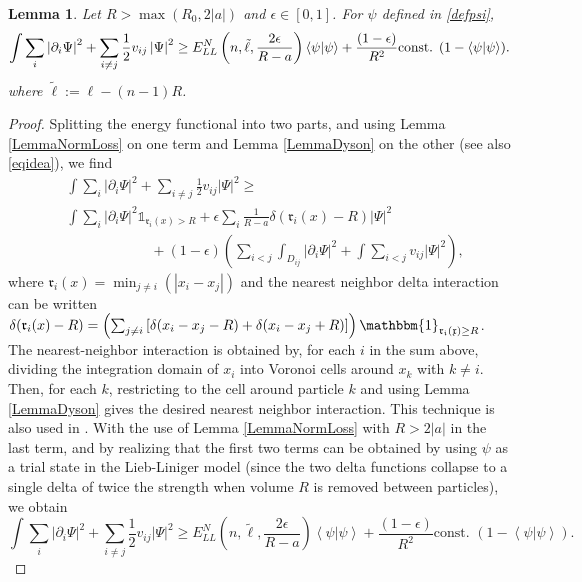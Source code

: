 \documentclass[a4paper,11pt]{article}
\newcommand{\abs}[1]{\left\lvert #1 \right\rvert}
\renewcommand{\braket}[1]{\left\langle#1\right\rangle}
\newtheorem{lemma}[theorem]{Lemma}
\numberwithin{equation}{section}
\begin{document}
	\begin{lemma}\label{LemmaNormBoundEpsilon}
		 Let $R>\max\left(R_0,2\abs{a}\right) $ and $ \epsilon\in[0,1] $. For $ \psi $ defined in \eqref{defpsi},
		\begin{equation}
		\int \sum_{i}\abs{\partial_i\Psi}^2+\sum_{i\neq j} \frac{1}{2}v_{ij}\abs{\Psi}^2\geq E_{LL}^N \left(n,\tilde{\ell},\frac{2\epsilon}{R-a}\right)\braket{\psi|\psi}+ \frac{(1-\epsilon)}{R^2}\textnormal{const. }(1-\braket{\psi|\psi}).
		\end{equation}
		where $ \tilde{\ell}:=\ell-(n-1)R $.
	\end{lemma}
	\begin{proof}
		Splitting the energy functional into two parts, and using Lemma \ref{LemmaNormLoss} on one term and Lemma \ref{LemmaDyson} on the other (see also \eqref{eqidea}), we find 
		\begin{equation}
		\begin{aligned}
		&\int \sum_{i}\abs{\partial_i\Psi}^2+\sum_{i\neq j} \frac{1}{2}v_{ij}\abs{\Psi}^2\geq\\ &\int\sum_{i}\abs{\partial_i\Psi}^2\mathds{1}_{\mathfrak{r}_i(x)>R}+\epsilon\sum_{i}\frac{1}{R-a}\delta(\mathfrak{r}_i(x)-R)\abs{\Psi}^2\\&\qquad\qquad\qquad+ (1-\epsilon)\left(\sum_{i<j}\int_{D_{ij}}\abs{\partial_i \Psi}^2+\int\sum_{i<j} v_{ij} \abs{\Psi}^2\right),
		\end{aligned}
		\end{equation}
		where $ \mathfrak{r}_i(x)=\min_{j\neq i}(\abs{x_i-x_j}) $ and the nearest neighbor delta interaction can be written $\delta(\mathfrak{r}_i(x)-R)=\left(\sum_{j\neq i}\left[\delta(x_i-x_j-R)+\delta(x_i-x_j+R)\right]\right)\mathbbm{1}_{\mathfrak{r_i(x)}\geq R}$. The nearest-neighbor interaction is obtained by, for each $i$ in the sum above, dividing the integration domain of $x_i$ into Voronoi cells around $x_k$ with $k\neq i$. Then, for each $k$, restricting to the cell around particle $ k $ and using Lemma \ref{LemmaDyson} gives the desired nearest neighbor interaction. This technique is also used in \cite{lieb2006mathematics}.
		With the use of Lemma \ref{LemmaNormLoss} with $ R>2\abs{a} $ in the last term, and by realizing that the first two terms can be obtained by using $ \psi $ as a trial state in the Lieb-Liniger model (since the two delta functions collapse to a single delta of twice the strength when volume $R$ is removed between particles), we obtain\begin{equation}
		\int \sum_{i}\abs{\partial_i\Psi}^2+\sum_{i\neq j} \frac{1}{2}v_{ij}\abs{\Psi}^2\geq E_{LL}^N \left(n,\tilde{\ell},\frac{2\epsilon}{R-a}\right)\braket{\psi|\psi}+ \frac{(1-\epsilon)}{R^2}\text{const. }(1-\braket{\psi|\psi}).
		\end{equation}
	\end{proof}
	
\end{document}
